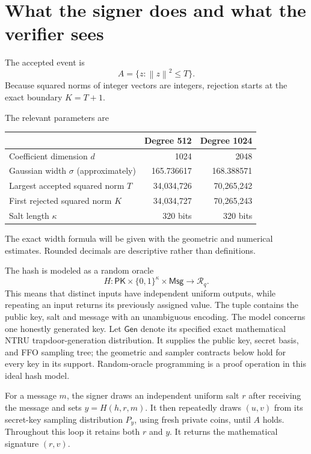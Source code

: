 \documentclass[11pt,a4paper]{article}
\newcommand{\norm}[1]{\left\lVert#1\right\rVert}
\theoremstyle{definition}
\theoremstyle{remark}
\numberwithin{equation}{section}
\begin{document}
\section{What the signer does and what the verifier sees}
\label{sec:signing-experiment}

The accepted event is
\[
 A=\{z:\norm{z}^2\le T\}.
\]
Because squared norms of integer vectors are integers, rejection starts at
the exact boundary $K=T+1$.

\begin{samepage}
The relevant parameters are
\begin{center}
\begin{tabular}{lrr}
\toprule
 & Degree 512 & Degree 1024\\
\midrule
Coefficient dimension $d$ & 1024 & 2048\\
Gaussian width $\sigma$ (approximately) & 165.736617 & 168.388571\\
Largest accepted squared norm $T$ & 34,034,726 & 70,265,242\\
First rejected squared norm $K$ & 34,034,727 & 70,265,243\\
Salt length $\kappa$ & 320 bits & 320 bits\\
\bottomrule
\end{tabular}
\end{center}
\end{samepage}
The exact width formula will be given with the geometric and numerical
estimates. Rounded decimals are descriptive rather than definitions.

The hash is modeled as a random oracle
\[
 H:\mathsf{PK}\times\{0,1\}^{\kappa}\times\mathsf{Msg}
 \longrightarrow\mathcal R_q.
\]
This means that distinct inputs have independent uniform outputs, while
repeating an input returns its previously assigned value. The tuple contains
the public key, salt and message with an unambiguous encoding. The model
concerns one honestly generated key. Let $\mathsf{Gen}$ denote its specified
exact mathematical NTRU trapdoor-generation distribution. It supplies the
public key, secret basis, and FFO sampling tree; the geometric and sampler
contracts below hold for every key in its support. Random-oracle programming
is a proof operation in this ideal hash model.

For a message $m$, the signer draws an independent uniform salt $r$ after
receiving the message and sets $y=H(h,r,m)$. It then repeatedly draws
$(u,v)$ from its secret-key sampling distribution $P_y$, using fresh private
coins, until $A$ holds. Throughout this loop it retains both $r$ and $y$.
It returns the mathematical signature $(r,v)$.
\end{document}
